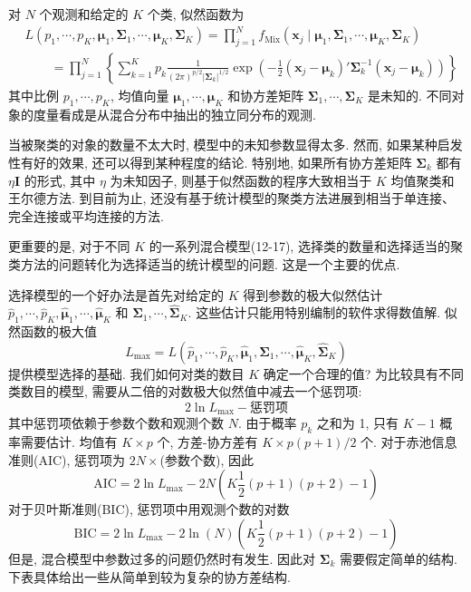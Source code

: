 
对 $N$ 个观测和给定的 $K$ 个类, 似然函数为
\label{eq:12-18}
\begin{equation}
\begin{aligned}
&L(p_1,\cdots,p_K,\boldsymbol{\mu}_1,\boldsymbol{\Sigma}_1,\cdots,\boldsymbol{\mu}_K,\boldsymbol{\Sigma}_K) = \prod_{j=1}^{N} f_{\mathrm{Mix}}(\mathbf{x}_j\mid \boldsymbol{\mu}_1,\boldsymbol{\Sigma}_1,\cdots,\boldsymbol{\mu}_K,\boldsymbol{\Sigma}_K)\\
&\qquad = \prod_{j=1}^{N}\left\{ \sum_{k=1}^{K} p_k \frac{1}{(2\pi)^{p/2}|\boldsymbol{\Sigma}_k|^{1/2}}\exp\left( -\frac{1}{2}(\mathbf{x}_j-\boldsymbol{\mu}_k)'\boldsymbol{\Sigma}_k^{-1}(\mathbf{x}_j-\boldsymbol{\mu}_k) \right) \right\}
\end{aligned}
\tag{12-18}
\end{equation}
其中比例 $p_1,\cdots,p_K$, 均值向量 $\boldsymbol{\mu}_1,\cdots,\boldsymbol{\mu}_K$ 和协方差矩阵 $\boldsymbol{\Sigma}_1,\cdots,\boldsymbol{\Sigma}_K$ 是未知的. 不同对象的度量看成是从混合分布中抽出的独立同分布的观测.

当被聚类的对象的数量不太大时, 模型中的未知参数显得太多. 然而, 如果某种启发性有好的效果, 还可以得到某种程度的结论. 特别地, 如果所有协方差矩阵 $\boldsymbol{\Sigma}_k$ 都有 $\eta\mathbf{I}$ 的形式, 其中 $\eta$ 为未知因子, 则基于似然函数的程序大致相当于 $K$ 均值聚类和王尔德方法. 到目前为止, 还没有基于统计模型的聚类方法进展到相当于单连接、完全连接或平均连接的方法.

更重要的是, 对于不同 $K$ 的一系列混合模型(12-17), 选择类的数量和选择适当的聚类方法的问题转化为选择适当的统计模型的问题. 这是一个主要的优点.

选择模型的一个好办法是首先对给定的 $K$ 得到参数的极大似然估计 $\hat{p}_1,\cdots,\hat{p}_K,\hat{\boldsymbol{\mu}}_1,\cdots,\hat{\boldsymbol{\mu}}_K$ 和 $\hat{\boldsymbol{\Sigma}}_1,\cdots,\hat{\boldsymbol{\Sigma}}_K$. 这些估计只能用特别编制的软件求得数值解. 似然函数的极大值
\[
L_{\max} = L(\hat{p}_1,\cdots,\hat{p}_K,\hat{\boldsymbol{\mu}}_1,\hat{\boldsymbol{\Sigma}}_1,\cdots,\hat{\boldsymbol{\mu}}_K,\hat{\boldsymbol{\Sigma}}_K)
\]
提供模型选择的基础. 我们如何对类的数目 $K$ 确定一个合理的值? 为比较具有不同类数目的模型, 需要从二倍的对数极大似然值中减去一个惩罚项:
\[
2\ln L_{\max} - \text{惩罚项}
\]
其中惩罚项依赖于参数个数和观测个数 $N$. 由于概率 $p_k$ 之和为 1, 只有 $K-1$ 概率需要估计. 均值有 $K\times p$ 个, 方差-协方差有 $K\times p(p+1)/2$ 个. 对于赤池信息准则(AIC), 惩罚项为 $2N\times$(参数个数), 因此
\label{eq:12-19}
\begin{equation}
\text{AIC} = 2\ln L_{\max} - 2N\left( K\frac{1}{2}(p+1)(p+2)-1 \right) \tag{12-19}
\end{equation}
对于贝叶斯准则(BIC), 惩罚项中用观测个数的对数
\label{eq:12-20}
\begin{equation}
\text{BIC} = 2\ln L_{\max} - 2\ln(N)\left( K\frac{1}{2}(p+1)(p+2)-1 \right) \tag{12-20}
\end{equation}
但是, 混合模型中参数过多的问题仍然时有发生. 因此对 $\boldsymbol{\Sigma}_k$ 需要假定简单的结构. 下表具体给出一些从简单到较为复杂的协方差结构.

